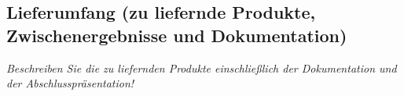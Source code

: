 \subsection{Lieferumfang (zu liefernde Produkte, Zwischenergebnisse und Dokumentation)}

\textit{
    Beschreiben Sie die zu liefernden Produkte einschließlich der Dokumentation und der Abschlusspräsentation!
}

